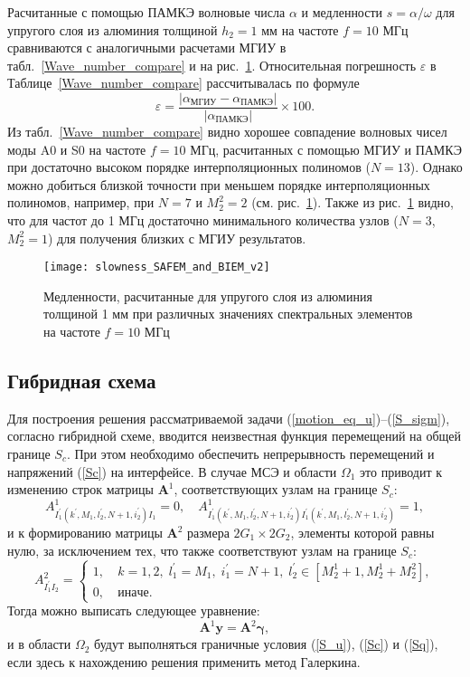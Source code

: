 \documentclass[press]{vestnik}
\begin{document}
Расчитанные с помощью ПАМКЭ волновые числа $\alpha$ и медленности $s=\alpha / \omega$ для упругого слоя из алюминия толщиной $h_{2} = 1$ мм на частоте $f=10$ МГц сравниваются с аналогичными расчетами МГИУ в табл.~\ref{Wave_number_compare} и на рис.~\ref{slowness}. Относительная погрешность $\varepsilon$ в Таблице~\ref{Wave_number_compare} рассчитывалась по формуле
$$
\varepsilon = \frac{\left| \alpha_{МГИУ} -\alpha_{ПАМКЭ}  \right|}{\left| \alpha_{ПАМКЭ} \right|} \times 100.
$$
Из табл.~\ref{Wave_number_compare} видно хорошее совпадение волновых чисел моды A0 и S0 на частоте $f=10$ МГц, расчитанных с помощью МГИУ и ПАМКЭ при достаточно высоком порядке интерполяционных полиномов ($N=13$). Однако можно добиться близкой точности при меньшем порядке интерполяционных полиномов, например, при $N=7$ и $M_{2}^{2}=2$ (см. рис.~\ref{slowness}). Также из рис.~\ref{slowness} видно, что для частот до 1 МГц достаточно минимального количества узлов ($N=3$, $M_{2}^{2}=1$) для получения близких с МГИУ результатов.
\begin{figure}[t!] 
	\begin{center}
		\texttt{[image: slowness\_SAFEM\_and\_BIEM\_v2]}
		\caption{Медленности, расчитанные для упругого слоя из алюминия толщиной 1 мм при различных значениях спектральных элементов на частоте $f=10$ МГц} \label{slowness}
	\end{center}
\end{figure}

	\subsection{Гибридная схема}
Для построения решения рассматриваемой задачи (\ref{motion_eq_u})--(\ref{S_sigm}), согласно гибридной схеме, вводится неизвестная функция перемещений на общей границе $S_{c}$. При этом необходимо обеспечить непрерывность перемещений и напряжений (\ref{Sc}) на интерфейсе. В случае МСЭ и области $\Omega_{1}$ это приводит к изменению строк матрицы $\bm{A}^{1}$, соответствующих узлам на границе $S_{c}$:
$$
A_{I_{1}^{'}(k^{'},M_{1},l_{2}^{'},N+1,i_{2}^{'}) I_{1}^{}}^{1} = 0, \quad A_{I_{1}^{'}(k^{'},M_{1},l_{2}^{'},N+1,i_{2}^{'}) I_{1}^{'}(k^{'},M_{1},l_{2}^{'},N+1,i_{2}^{'})}^{1} = 1,
$$
и к формированию матрицы  $\bm{A}^{2}$ размера $2G_{1} \times 2G_{2}$, элементы которой равны нулю, за исключением тех, что также соответствуют узлам на границе $S_{c}$:
$$
A_{I_{1}^{'}I_{2}}^{2}= 
\left\{ 
\begin{array}{cl}
	1, &\ k=1,2, \; l_{1}^{'}=M_{1}, \; i_{1}^{'}=N+1, \; l_{2}^{'} \in [M_{2}^{1}+1, M_{2}^{1}+M_{2}^{2}], 
	\\
	0, &\ иначе.
\end{array} 
\right.
$$
Тогда можно выписать следующее уравнение:
$$
\bm{A}^{1} \bm{y} = \bm{A}^{2} \bm{\gamma},
$$
и в области $\Omega_{2}$ будут выполняться граничные условия (\ref{S_u}), (\ref{Sc}) и (\ref{Sq}), если здесь к нахождению решения применить метод Галеркина.
\end{document}

